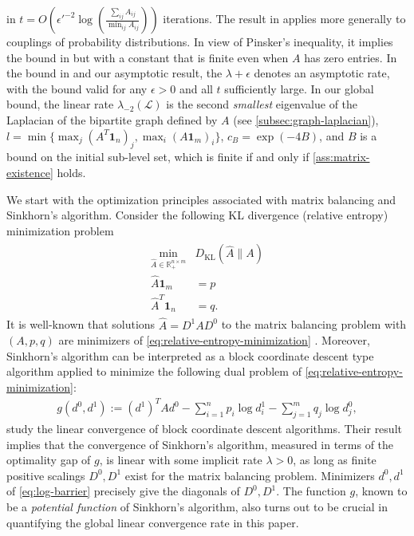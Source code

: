 \begin{table*}
\begin{adjustwidth}{-1.1cm}{}
{in $t=O(\epsilon'^{-2}\log(\frac{\sum_{ij}A_{ij}}{\min_{ij}A_{ij}}))$
iterations. The result in \citet{leger2021gradient} applies more generally to couplings
of probability distributions. In view of Pinsker's inequality, it implies the bound in \citet{altschuler2017near} but with a constant that is finite even when $A$ has zero entries. In the bound in \citet{knight2008sinkhorn} and our
asymptotic result, the $\lambda+\epsilon$ denotes an asymptotic rate, with the
bound valid for any $\epsilon>0$ and all $t$ sufficiently large. In our global bound, the linear rate $\lambda_{-2}(\mathcal{L})$ is the second \emph{smallest} eigenvalue of the Laplacian of the bipartite graph defined by $A$ (see \cref{subsec:graph-laplacian}), $ l=\min \{\max_j (A^T\mathbf{1}_n)_j, \max_i (A\mathbf{1}_m)_i\}$,
$c_B=\exp(-4B)$, and $B$ is a bound on the initial sub-level set, which is finite if and only if \cref{ass:matrix-existence} holds.
}
\label{tab:convergence-summary}
\end{adjustwidth}
\end{table*}
We start with the optimization principles associated with matrix balancing and Sinkhorn's algorithm. Consider the following KL divergence (relative entropy) minimization problem 
     \begin{align}
\label{eq:relative-entropy-minimization}
\begin{split}
  \min_{\hat A\in \mathbb{R}^{n\times m}_+} & D_{\text{KL}}(\hat{A}\| A)\\
\hat{A}\mathbf{1}_m & =p\\
\hat{A}^{T}\mathbf{1}_n & =q.
\end{split}
\end{align}
It is well-known that solutions $\hat{A}=D^1AD^0$ to the matrix balancing problem with $(A,p,q)$ are minimizers of \eqref{eq:relative-entropy-minimization} \citep{ireland1968contingency,bregman1967proof}. Moreover, Sinkhorn's algorithm can be interpreted as a block coordinate descent type algorithm applied to minimize the following dual problem of \eqref{eq:relative-entropy-minimization}:
 \begin{align}
 \label{eq:log-barrier}
     g(d^0,d^1)	:=(d^1)^{T}Ad^0-\sum_{i=1}^{n}p_{i}\log d^1_{i}-\sum_{j=1}^{m}q_{j}\log d^0_{j},
\end{align} 
\citet{luo1992convergence} study the linear convergence of block coordinate descent algorithms. Their result implies that the
convergence of Sinkhorn's algorithm, measured in terms of the optimality gap of $g$, is linear with some implicit rate $\lambda>0$,
 as long as finite positive scalings $D^0,D^1$ exist for the matrix balancing problem. Minimizers $d^0,d^1$ of \eqref{eq:log-barrier} precisely give the diagonals of $D^0,D^1$. The function $g$, known to be a \emph{potential function} of Sinkhorn's algorithm, also turns out to be crucial in quantifying the global linear convergence rate in this paper. 

